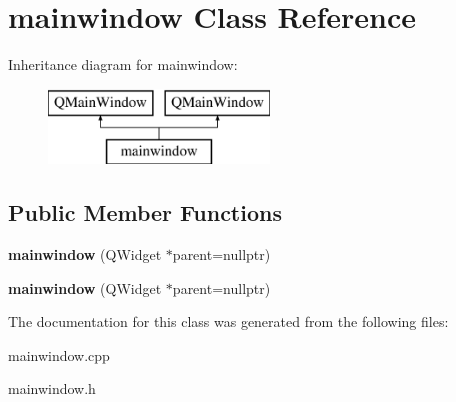 \hypertarget{classmainwindow}{}\section{mainwindow Class Reference}
\label{classmainwindow}
Inheritance diagram for mainwindow\+:\begin{figure}[H]
\begin{center}
\leavevmode
\includegraphics[height=2.000000cm]{classmainwindow}
\end{center}
\end{figure}
\subsection*{Public Member Functions}
\begin{DoxyCompactItemize}
\item 
\mbox{\label{classmainwindow_a0fdd6899038444a0c46052859468f67f}} 
{\bfseries mainwindow} (Q\+Widget $\ast$parent=nullptr)
\item 
\mbox{\label{classmainwindow_a0fdd6899038444a0c46052859468f67f}} 
{\bfseries mainwindow} (Q\+Widget $\ast$parent=nullptr)
\end{DoxyCompactItemize}


The documentation for this class was generated from the following files\+:\begin{DoxyCompactItemize}
\item 
mainwindow.\+cpp\item 
mainwindow.\+h\end{DoxyCompactItemize}
